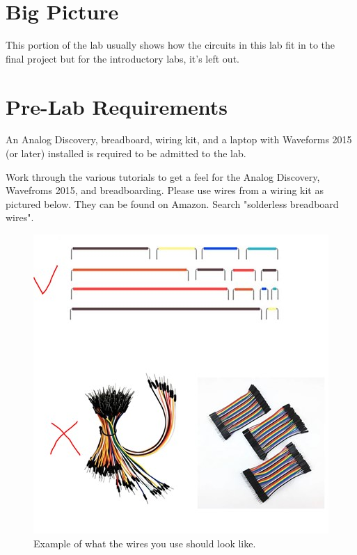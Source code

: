 \section{Big Picture}

This portion of the lab usually shows how the circuits in this lab fit in to the final project but for the introductory labs, it's left out. 

\section{Pre-Lab Requirements}

An Analog Discovery, breadboard, wiring kit, and a laptop with Waveforms 2015 (or later) installed is required to be admitted to the lab. 

Work through the various tutorials to get a feel for the Analog Discovery, Wavefroms 2015, and breadboarding.
Please use wires from a wiring kit as pictured below. They can be found on Amazon. Search "solderless breadboard wires".

\begin{figure} [!htb]
	\centering
		\includegraphics[width=1\textwidth]{wiring.jpg}
	\caption{Example of what the wires you use should look like.} \label{fig:wires}
\end{figure}

